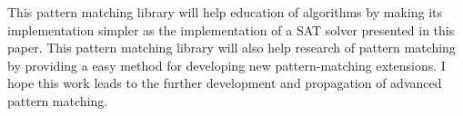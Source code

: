 \documentclass[acmlarge]{acmart}
\begin{document}
This pattern matching library will help education of algorithms by making its implementation simpler as the implementation of a SAT solver presented in this paper.
This pattern matching library will also help research of pattern matching by providing a easy method for developing new pattern-matching extensions.
I hope this work leads to the further development and  propagation of advanced pattern matching.




\end{document}
